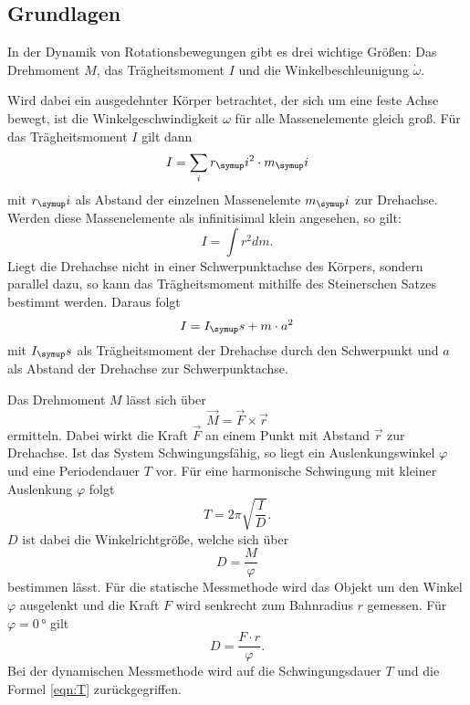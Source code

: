 \subsection{Grundlagen}
In der Dynamik von Rotationsbewegungen gibt es drei wichtige Größen:
Das Drehmoment $M$, das Trägheitsmoment $I$ und die Winkelbeschleunigung $\dot
\omega$.

Wird dabei ein ausgedehnter Körper betrachtet, der sich um eine feste Achse bewegt,
ist die Winkelgeschwindigkeit $\omega$ für alle Massenelemente gleich groß.
Für das Trägheitsmoment $I$ gilt dann
\begin{equation}
  I = \sum_i r_\su{i}^2 \cdot m_\su{i}
\end{equation}
mit $r_\su{i}$ als Abstand der einzelnen Massenelemte $m_\su{i}$ zur Drehachse.
Werden diese Massenelemente als infinitisimal klein angesehen, so gilt:
\begin{equation}
  I = \int r^2dm.
\end{equation}
Liegt die Drehachse nicht in einer Schwerpunktachse des Körpers, sondern parallel dazu,
so kann das Trägheitsmoment mithilfe des Steinerschen Satzes bestimmt werden.
Daraus folgt
\begin{equation}
  I = I_\su{s} + m \cdot a^2
\end{equation}
mit $I_\su{s}$ als Trägheitsmoment der Drehachse durch den Schwerpunkt und $a$ als
Abstand der Drehachse zur Schwerpunktachse.

Das Drehmoment $M$ lässt sich über
\begin{equation}
  \vec{M} = \vec{F} \times \vec{r} \label{eqn:M}
\end{equation}
ermitteln. Dabei wirkt die Kraft $\vec{F}$ an einem Punkt mit Abstand $\vec{r}$
zur Drehachse.
Ist das System Schwingungsfähig, so liegt ein Auslenkungswinkel $\varphi$ und eine
Periodendauer $T$ vor. Für eine harmonische Schwingung mit kleiner Auslenkung $\varphi$
folgt
\begin{equation}
  T = 2\pi\sqrt{\frac{I}{D}}. \label{eqn:T}
\end{equation}
$D$ ist dabei die Winkelrichtgröße, welche sich über
\begin{equation}
  D = \frac{M}{\varphi}
\end{equation}
bestimmen lässt.
Für die statische Messmethode wird das Objekt um den Winkel $\varphi$ ausgelenkt
und die Kraft $F$ wird senkrecht zum Bahnradius $r$ gemessen. Für $\varphi = 0 \,\si{\degree}$
gilt
\begin{equation}
  D = \frac{F \cdot r}{\varphi}. \label{eqn:D}
\end{equation}
Bei der dynamischen Messmethode wird auf die Schwingungsdauer $T$ und die Formel
\eqref{eqn:T} zurückgegriffen.
\newpage
